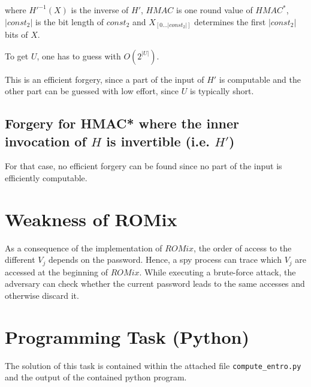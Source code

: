 where $H'^{-1}(X)$ is the inverse of $H'$, $HMAC$ is one round value of $HMAC^*$, $|const_2|$ is the bit length of $const_2$ and $X_{[0...|const_2|]}$ determines the first $|const_2|$ bits of $X$.

To get $U$, one has to guess with $O(2^{|U|})$.

This is an efficient forgery, since a part of the input of $H'$ is computable and the other part can be guessed with low effort, since $U$ is typically short.

\subsection{Forgery for HMAC* where the inner invocation of $H$ is invertible (i.e. $H'$)}

For that case, no efficient forgery can be found since no part of the input is efficiently computable.

\section{Weakness of ROMix}

As a consequence of the implementation of $ROMix$, the order of access to the different $V_j$ depends on the password. Hence, a spy process can trace which $V_j$ are accessed at the beginning of $ROMix$. While executing a brute-force attack, the adversary can check whether the current password leads to the same accesses and otherwise discard it.


\section{Programming Task (Python)}

The solution of this task is contained within the attached file \texttt{compute\_entro.py} and the output of the contained python program.



